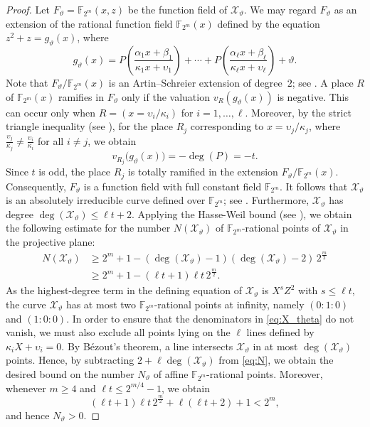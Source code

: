 \documentclass[12pt]{article}
\theoremstyle{plain}
\theoremstyle{definition}
\newcommand{\F}{\mathbb{F}}
\begin{document}
	\begin{proof}
		Let $F_\vartheta=\F_{2^m}(x,z)$ be the function field of $\mathcal{X}_\vartheta $.
		We may regard $F_\vartheta$ as an extension of the rational function field
		$\F_{2^m}(x)$ defined by the equation $z^2+z=g_\vartheta(x)$,
		where
		\[
		g_\vartheta(x)
		=
		P\!\left( \frac{\alpha_1 x+\beta_1}{\kappa_1 x+\upsilon_1} \right)
		+
		\cdots
		+
		P\!\left( \frac{\alpha_\ell x+\beta_\ell}{\kappa_\ell x+\upsilon_\ell} \right)
		+\vartheta.
		\]
		Note that $F_\vartheta/\F_{2^m}(x)$ is an Artin--Schreier extension of degree~$2$;
		see \cite[Proposition~3.7.8]{sti}.
		A place $R$ of $\F_{2^m}(x)$ ramifies in $F_\vartheta$ only if the valuation
		$v_R(g_\vartheta(x))$ is negative.
		This can occur only when $R=(x=\upsilon_i/\kappa_i)$ for $i=1, \ldots, \ell$.
		Moreover, by the strict triangle inequality (see \cite[Lemma~1.1.11]{sti}), 
		for the place $R_j$ corresponding to 
		$x = \upsilon_j/\kappa_j$, where $\tfrac{\upsilon_j}{\kappa_j} \neq \tfrac{\upsilon_i}{\kappa_i}$ for all $i \neq j$,
		we obtain
		\[
		v_{R_j}\bigl(g_\vartheta(x)\bigr) = -\deg(P) = -t.
		\]
		Since $t$ is odd, the place $R_j$ is totally ramified in the extension
		$F_\vartheta/\F_{2^m}(x)$.
		Consequently, $F_\vartheta$ is a function field with full constant field
		$\F_{2^m}$.
		It follows that $\mathcal{X}_\vartheta$ is an absolutely irreducible curve defined
		over $\F_{2^m}$; see \cite[Corollary~3.6.8]{sti}.
		Furthermore, $\mathcal{X}_\vartheta $ has degree
		$\deg(\mathcal{X}_\vartheta)\le \ell t+2$.
		Applying the Hasse-Weil bound (see \cite[Theorem~9.57]{hkt}), we obtain the following
		estimate for the number $N(\mathcal{X}_\vartheta)$ of $\F_{2^m}$-rational points of
		$\mathcal{X}_\vartheta$ in the projective plane:
		\begin{align}\label{eq:N}
			N(\mathcal{X}_\vartheta)
			&\ge
			2^m+1-(\deg(\mathcal{X}_\vartheta)-1)(\deg(\mathcal{X}_\vartheta)-2)\,2^{\frac{m}{2}} \nonumber\\
			&\ge
			2^m+1-(\ell t+1)\ell t \,2^{\frac{m}{2}}.
		\end{align}
		As the highest-degree term in the defining equation of
		$\mathcal{X}_\vartheta$ is $X^{s}Z^2$ with $s\le \ell t$, the curve
		$\mathcal{X}_\vartheta$ has at most two $\F_{2^m}$-rational points at infinity, namely $(0:1:0)$ and $(1:0:0)$.
		In order to ensure that the denominators in \eqref{eq:X_theta} do not vanish, 
		we must also exclude all points lying on the $\ell$ lines defined by $\kappa_i X + \upsilon_i = 0$.
		By Bézout’s theorem, a line intersects $\mathcal{X}_\vartheta$ in at most $\deg(\mathcal{X}_\vartheta)$ points.
		Hence, by subtracting $2+\ell\deg(\mathcal{X}_\vartheta)$ from \eqref{eq:N}, we obtain the desired bound on the number $N_\vartheta$ of affine $\F_{2^m}$-rational points. 
		Moreover, whenever $m \ge 4$
		and $\ell t \le 2^{m/4}-1$, we obtain
		\[
		(\ell t+1)\ell t\,2^{\frac{m}{2}} + \ell(\ell t+2) + 1 < 2^{m},
		\]
		and hence $N_\vartheta > 0$.
	\end{proof}
	
\end{document}
